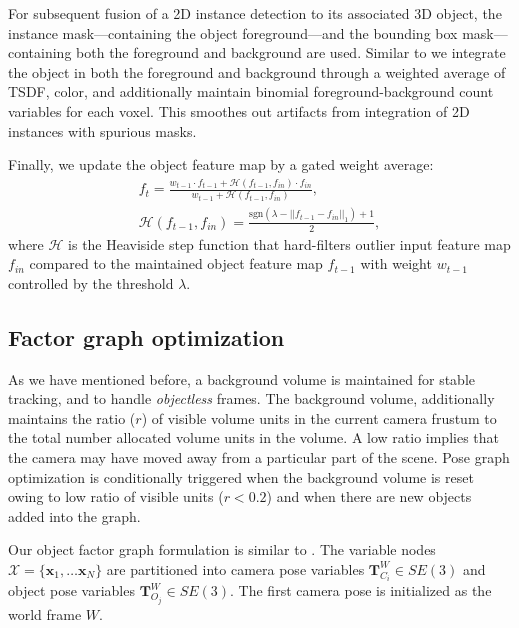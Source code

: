 
For subsequent fusion of a 2D instance detection to its associated 3D object, the instance mask---containing the object foreground---and the bounding box mask---containing both the foreground and background are used. Similar to \cite{mccormacFusionVolumetricObjectLevel2018} we integrate the object in both the foreground and background through a weighted average of TSDF, color, and additionally maintain binomial foreground-background count variables for each voxel. This smoothes out artifacts from integration of 2D instances with spurious masks.

Finally, we update the object feature map by a gated weight average:
\begin{align}
    f_t = \frac{w_{t-1} \cdot f_{t-1} + \mathcal{H}(f_{t-1}, f_{in}) \cdot f_{in}}{w_{t-1} + \mathcal{H}(f_{t-1}, f_{in})},\\
    \mathcal{H}(f_{t-1}, f_{in}) = \frac{\textrm{sgn}(\lambda - ||f_{t-1} - f_{in}||_1) + 1}{2},
\end{align}
where $\mathcal{H}$ is the Heaviside step function that hard-filters outlier input feature map $f_{in}$ compared to the maintained object feature map $f_{t-1}$ with weight $w_{t-1}$ controlled by the threshold $\lambda$.

\subsection{Factor graph optimization} \label{subsec: optimization}
As we have mentioned before, a background volume is maintained for stable tracking, and to handle \textit{objectless} frames. The background volume, additionally maintains the ratio ($r$) of visible volume units in the current camera frustum to the total number allocated volume units in the volume. A low ratio implies that the camera may have moved away from a particular part of the scene. Pose graph optimization is conditionally triggered when the background volume is reset owing to low ratio of visible units ($r < 0.2$) and when there are new objects added into the graph.

Our object factor graph formulation is similar to \cite{salas-morenoSLAMSimultaneousLocalisation2013, mccormacFusionVolumetricObjectLevel2018}. The variable nodes $\mathcal{X} = \{\mathbf{x}_1, \dots \mathbf{x}_N\}$ are partitioned into camera pose variables $\mathbf{T}^{W}_{C_i} \in SE(3)$ and object pose variables $\mathbf{T}^W_{O_j} \in SE(3)$. The first camera pose is initialized as the world frame $W$.

